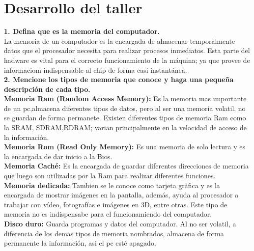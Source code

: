 \documentclass{article}
\begin{document}
\section{Desarrollo del taller} \label{contenido}

\textbf{1. Defina que es la memoria del computador.}\vspace{0.5cm} \\

    La memoria de un computador es la encargada de almacenar temporalmente datos que el procesador necesita para realizar procesos inmediatos. Esta parte del hadware es vital para el correcto funcionamiento de la máquina; ya que provee de informaciom indispensable al chip de forma casi instantánea. \vspace{0.5cm} \\
    
\textbf{2. Mencione los tipos de memoria que conoce y haga una pequeña descripción de cada tipo.}\vspace{0.5cm} \\

\textbf{Memoria Ram (Random Access Memory):} Es la memoria mas importante de un pc,almacena diferentes tipos de datos, pero al ser una memoria volatil, no se guardan de forma permanete. Existen diferentes tipos de memoria Ram como la SRAM, SDRAM,RDRAM; varian principalmente en la velocidad de acceso de la información.\vspace{0.5cm} \\

\textbf{Memoria Rom (Read Only Memory):} Es una memoria de solo lectura y es la encargada de dar inicio a la Bios.\vspace{0.5cm} \\

\textbf{Memoria Caché:} Es la encargada de guardar diferentes direcciones de memoria que luego son utilizadas por la Ram para realizar diferentes funciones.\vspace{0.5cm} \\

\textbf{Memoria dedicada:} Tambien se le conoce como tarjeta gráfica y es la encargada de mostrar imágenes en la pantalla, además, ayuda al procesador a trabajar con vídeo, fotografías e imágenes en 3D, entre otras. Este tipo de memoria no es indispensabe para el funcionamiendo del computador. \vspace{0.5cm} \\

\textbf{Disco duro:} Guarda programas y datos del computador. Al no ser volatil, a diferencia de los demas tipos de memoria nombrados, almacena de forma permanente la información, asi el pc esté apagado. \vspace{0.5cm} \\
\end{document}

